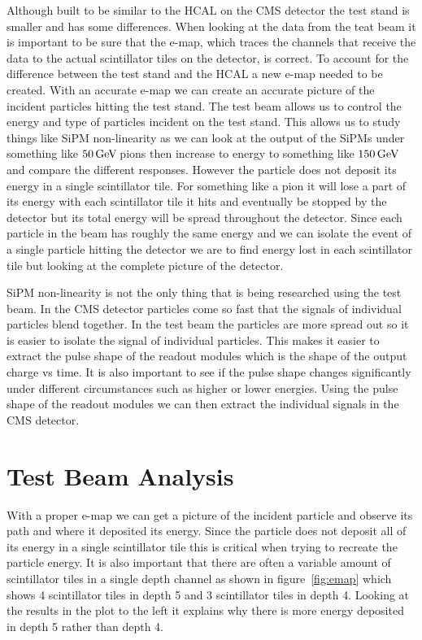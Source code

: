 Although built to be similar to the HCAL on the CMS detector the test stand is smaller and has some differences. When looking at the data from the teat beam it is important to be sure that the e-map, which traces the channels that receive the data to the actual scintillator tiles on the detector, is correct. To account for the difference between the test stand and the HCAL a new e-map needed to be created. With an accurate e-map we can create an accurate picture of the incident particles hitting the test stand. The test beam allows us to control the energy and type of particles incident on the test stand. This allows us to study things like SiPM non-linearity as we can look at the output of the SiPMs under something like $50 {\,\text{Ge\hspace{-.08em}V\hspace{-0.16em}}}$ pions then increase to energy to something like $150 {\,\text{Ge\hspace{-.08em}V\hspace{-0.16em}}}$ and compare the different responses. However the particle does not deposit its energy in a single scintillator tile. For something like a pion it will lose a part of its energy with each scintillator tile it hits and eventually be stopped by the detector but its total energy will be spread throughout the detector. Since each particle in the beam has roughly the same energy and we can isolate the event of a single particle hitting the detector we are to find energy lost in each scintillator tile but looking at the complete picture of the detector. 

SiPM non-linearity is not the only thing that is being researched using the test beam. In the CMS detector particles come so fast that the signals of individual particles blend together. In the test beam the particles are more spread out so it is easier to isolate the signal of individual particles. This makes it easier to extract the pulse shape of the readout modules which is the shape of the output charge vs time. It is also important to see if the pulse shape changes significantly under different circumstances such as higher or lower energies. Using the pulse shape of the readout modules we can then extract the individual signals in the CMS detector.

\section{Test Beam Analysis}

With a proper e-map we can get a picture of the incident particle and observe its path and where it deposited its energy. Since the particle does not deposit all of its energy in a single scintillator tile this is critical when trying to recreate the particle energy. It is also important that there are often a variable amount of scintillator tiles in a single depth channel as shown in figure~\ref{fig:emap} which shows 4 scintillator tiles in depth 5 and 3 scintillator tiles in depth 4. Looking at the results in the plot to the left it explains why there is more energy deposited in depth 5 rather than depth 4. 

